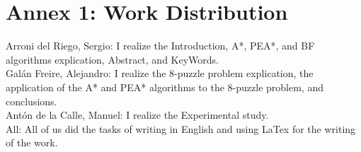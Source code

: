 \documentclass[runningheads]{llncs}
\begin{document}
 
 
\appendix
\chapter*{Annex 1: Work Distribution}
Arroni del Riego, Sergio: I realize the Introduction, A*, PEA*, and BF algorithms explication, Abstract, and KeyWords.\\
Galán Freire, Alejandro: I realize the 8-puzzle problem explication, the application of the A* and PEA* algorithms to the 8-puzzle problem, and conclusions.\\
Antón de la Calle, Manuel: I realize the Experimental study.\\
All: All of us did the tasks of writing in English and using LaTex for the writing of the work.
\end{document}
